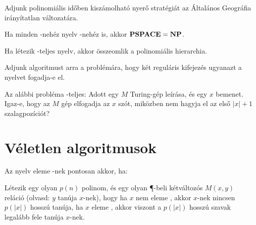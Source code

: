 \begin{Exercise}[counter={sorszam}, difficulty=2]
Adjunk polinomiális időben kiszámolható nyerő stratégiát az Általános Geográfia
irányítatlan változatára.

\end{Exercise}


\begin{Exercise}[counter={sorszam}, difficulty=0]
Ha minden \NP-nehéz nyelv \PSPACE-nehéz is, akkor $\mbox{\ensuremath{\mathbf{PSPACE}}}=\mbox{\ensuremath{\mathbf{NP}}}$.
\end{Exercise}


\begin{Exercise}[counter={sorszam}, difficulty=-1]
Ha létezik \PH-teljes nyelv, akkor összeomlik a polinomiális hierarchia.
\end{Exercise}



\begin{Exercise}[counter={sorszam}, difficulty=0]
Adjunk \PSPACE algoritmust arra a problémára, hogy két reguláris kifejezés ugyanazt
a nyelvet fogadja-e el. 
\end{Exercise}


\begin{Exercise}[counter={sorszam}, difficulty=0]
Az alábbi probléma \PSPACE-teljes: Adott egy $M$ Turing-gép leírása, és egy $x$ bemenet. Igaz-e, hogy az $M$ gép elfogadja az $x$ szót, miközben nem hagyja el az első $|x|+1$ szalagpozíciót?

\end{Exercise}



\chapter{Véletlen algoritmusok}

\begin{Exercise}[counter={sorszam}, difficulty=0]
Az \Language nyelv eleme \RP-nek pontosan akkor, ha:

Létezik egy olyan $p(n)$ polinom, és egy olyan \P-beli kétváltozós $M(x,y)$ reláció
(olvasd: $y$ tanúja $x$-nek), hogy ha $x$ nem eleme \Language, akkor $x$-nek nincsen $p(|x|)$
hosszú tanúja, ha $x$ eleme \Language, akkor viszont a $p(|x|)$ hosszú szavak legalább
fele tanúja $x$-nek.
\end{Exercise}


